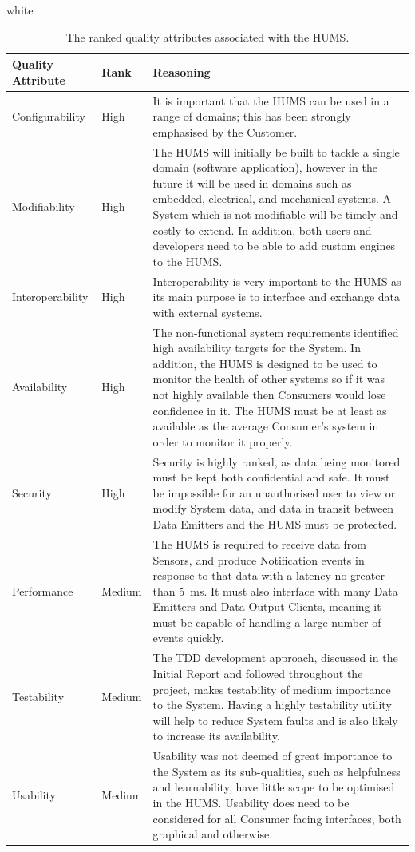 \documentclass[10pt,a4paper]{article}
\newcommand{\tableformat}[4]{
\begin{table}[ht!]
\centering
  \rowcolors{2}{gray!10} {white}
\def\arraystretch{1.5}
\begin{tabularx}{\textwidth}{#1}
  \hline
  \rowcolor[gray]{0.9} #2
  \hline
\end{tabularx}
\caption{#3}
\label{#4}
\end{table}}
\begin{document}
\tableformat{ p{2.4cm} p{1.2cm} X }{
\hline
Quality \newline Attribute & Rank & Reasoning \\
\hline
Configurability & High & It is important that the HUMS can be used in a range of domains; this has been strongly emphasised by the Customer. 
\\
Modifiability & High & The HUMS will initially be built to tackle a single domain (software application), however in the future it will be used in domains such as embedded, electrical, and mechanical systems. A System which is not modifiable will be timely and costly to extend. In addition, both users and developers need to be able to add custom engines to the HUMS.
\\
Interoperability & High & Interoperability is very important to the HUMS as its main purpose is to interface and exchange data with external systems.
\\
Availability & High & The non-functional system requirements identified high availability targets for the System. In addition, the HUMS is designed to be used to monitor the health of other systems so if it was not highly available then Consumers would lose confidence in it. The HUMS must be at least as available as the average Consumer's system in order to monitor it properly.
\\
Security & High & Security is highly ranked, as data being monitored must be kept both confidential and safe. It must be impossible for an unauthorised user to view or modify System data, and data in transit between Data Emitters and the HUMS must be protected.
\\
Performance & Medium & The HUMS is required to receive data from Sensors, and produce Notification events in response to that data with a latency no greater than 5~ms. It must also interface with many Data Emitters and Data Output Clients, meaning it must be capable of handling a large number of events quickly.
\\
Testability & Medium & The TDD development approach, discussed in the Initial Report and followed throughout the project, makes testability of medium importance to the System. Having a highly testability utility will help to reduce System faults and is also likely to increase its availability.
\\
Usability & Medium & Usability was not deemed of great importance to the System as its sub-qualities, such as helpfulness and learnability, have little scope to be optimised in the HUMS. Usability does need to be considered for all Consumer facing interfaces, both graphical and otherwise.
\\
}{The ranked quality attributes associated with the HUMS.}{tab:qualities}
\end{document}
